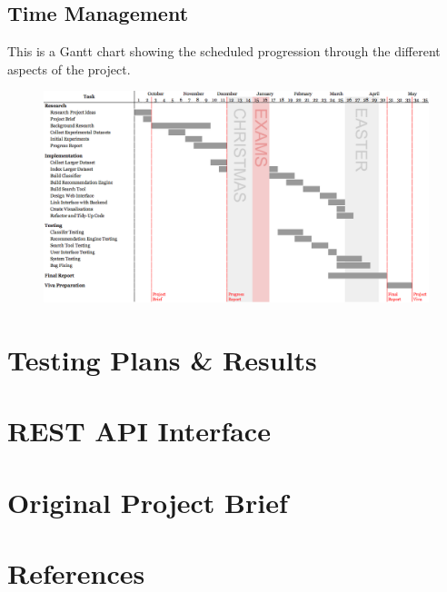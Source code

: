 \documentclass[12pt,a4paper]{article}
\begin{document}
\begin{landscape}
    \appendix
    \section{Time Management}
    \label{appendix:gantt}
    This is a Gantt chart showing the scheduled progression through the different aspects of the project.

    \begin{figure}[H]
        \centering
        \includegraphics[height=0.85\textwidth]{gantt.png}
    \end{figure}
\end{landscape}

\section{Testing Plans \& Results}
\pagebreak

\section{REST API Interface}
\pagebreak

\section{Original Project Brief}
\pagebreak


\setcounter{secnumdepth}{0}
\section{References}
{\footnotesize \printbibliography[heading=none]}
\end{document}
